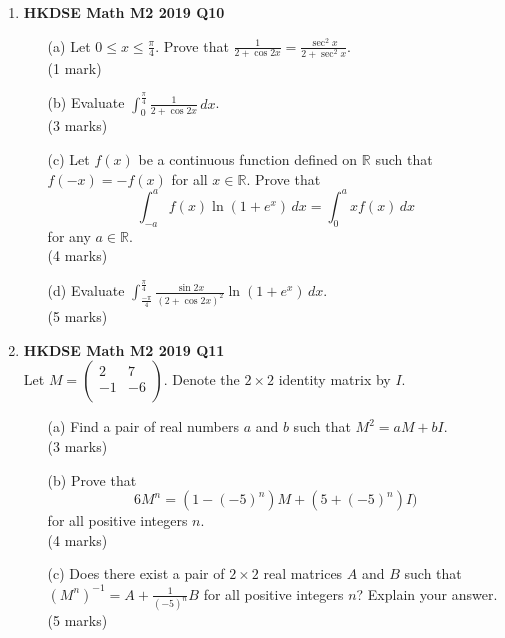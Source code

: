 \documentclass{report}
\begin{document}
\begin{enumerate}
	\newpage

	\item \textbf{HKDSE Math M2 2019 Q10}
	\begin{enumerate}
		\item [(a)] Let $0 \leq x \leq \displaystyle\frac{\pi}{4}$. Prove that $\displaystyle\frac{1}{2+\cos{2x}} = \frac{\sec^2{x}}{2+\sec^2{x}}$. \\(1 mark) 
		\item [(b)] Evaluate $\displaystyle \int_{0}^{ \tfrac{\pi}{4}} \frac{1}{2+\cos{2x}}\,dx$. \\(3 marks)
		\item [(c)] Let $f(x)$ be a continuous function defined on $\mathbb{R}$ such that $f(-x) = -f(x)$ for all $x \in \mathbb{R}$. Prove that $$\displaystyle\int_{-a}^{a} f(x)\ln{(1+e^x)}\,dx = \int_{0}^{a} xf(x)\,dx$$ for any $a \in \mathbb{R}  $. \\(4 marks)
		\item [(d)] Evaluate $\displaystyle \int_{\tfrac{-\pi}{4}}^{\tfrac{\pi}{4}}  \frac{\sin{2x}}{(2+\cos{2x})^2}\ln(1 + e^x)\,dx$. \\(5 marks)
	\end{enumerate}

	\item \textbf{HKDSE Math M2 2019 Q11}\\
	Let $M = \begin{pmatrix}
		2 &7 \\
		-1&-6\\
	\end{pmatrix}$. Denote the $2 \times2$ identity matrix by $I$. 
	\begin{enumerate}
		\item[(a)]Find a pair of real numbers $a$ and $b$ such that $M^2 = aM + bI$. \\(3 marks) 
		\item[(b)]
		Prove that $$6M^n = (1-(-5)^n)M+(5+(-5)^n)I)$$ for all positive integers $n$. \\(4 marks)
		\item[(c)]Does there exist a pair of $2\times2$ real matrices $A$ and $B$ such that $(M^n)^{-1} = A +\displaystyle \frac{1}{(-5)^n}B$ for all positive integers $n$? Explain your answer. \\(5 marks)
	\end{enumerate}


\end{enumerate}
\end{document}
